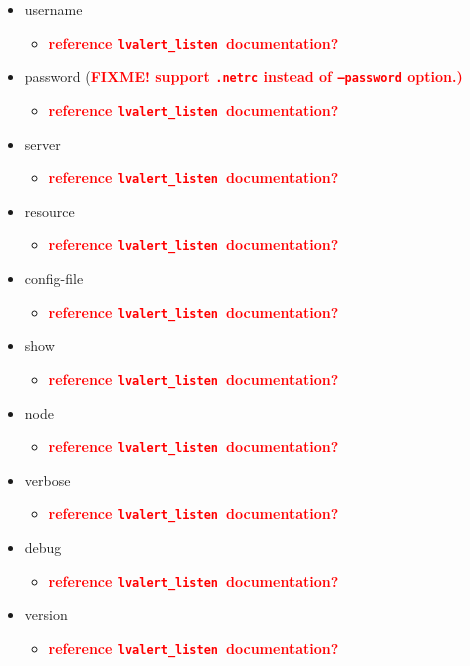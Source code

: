 \documentclass{article}
\newcommand{\FIXME}[1]{\textcolor{red}{\textbf{#1}}}
\newcommand{\lvalertListen}{\texttt{lvalert\_listen}~}
\begin{document}
\begin{itemize}
    \item{username
        \begin{itemize}
            \item{\FIXME{reference \lvalertListen documentation?}}
        \end{itemize}
         }
    \item{password (\FIXME{FIXME! support \texttt{.netrc} instead of \texttt{--password} option.)}
        \begin{itemize}
            \item{\FIXME{reference \lvalertListen documentation?}}
        \end{itemize}
         }
    \item{server
        \begin{itemize}
            \item{\FIXME{reference \lvalertListen documentation?}}
        \end{itemize}
         }
    \item{resource
        \begin{itemize}
            \item{\FIXME{reference \lvalertListen documentation?}}
        \end{itemize}
         }
    \item{config-file
        \begin{itemize}
            \item{\FIXME{reference \lvalertListen documentation?}}
        \end{itemize}
         }
    \item{show
        \begin{itemize}
            \item{\FIXME{reference \lvalertListen documentation?}}
        \end{itemize}
         }
    \item{node
        \begin{itemize}
            \item{\FIXME{reference \lvalertListen documentation?}}
        \end{itemize}
         }
    \item{verbose
        \begin{itemize}
            \item{\FIXME{reference \lvalertListen documentation?}}
        \end{itemize}
         }
    \item{debug
        \begin{itemize}
            \item{\FIXME{reference \lvalertListen documentation?}}
        \end{itemize}
         }
    \item{version
        \begin{itemize}
            \item{\FIXME{reference \lvalertListen documentation?}}
        \end{itemize}
         }
\end{itemize}
\end{document}
